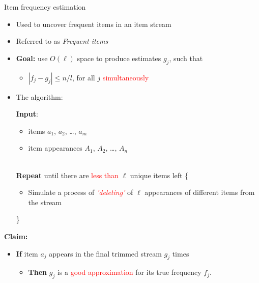\documentclass[first=dgreen,second=purple,logo=redque]{aaltoslides}
\begin{document}
\begin{frame}[allowframebreaks=1]{Item frequency estimation}
\begin{itemize}
    \item Used to uncover \textcolor{dgreen}{frequent} items in an item stream 
	\item Referred to as \textcolor{dgreen}{\textit{Frequent-items}}
	\item \textbf{Goal:} use $O(\ell)$ space to produce estimates $g_{j}$, such
	that
	\begin{itemize}\item{$|f_{j} - g_{j} | \leq n/l$}, for all $j$
	\textcolor{red}{simultaneously}\end{itemize}

\item The algorithm:
  \begin{algorithmic}
    \State \textbf{Input}:\begin{itemize}\item \textcolor{dgreen}{items} $a_{1}$, $a_{2}$, \ldots,
    $a_{m}$
    \item \textcolor{dgreen}{item appearances} $A_{1}$, $A_{2}$, \ldots,
    $A_{n}$\end{itemize}
    \\\State \textbf{Repeat} until there are \textcolor{red}{less than}
    $\ell$ \textcolor{dgreen}{unique} items left \{
     \begin{itemize}\item Simulate a process of
     \textcolor{red}{\textit{'deleting'}} of $\ell$ appearances of
     \textcolor{dgreen}{different} items from the stream\end{itemize}
    \State \}
  \end{algorithmic}
\end{itemize}


\framebreak

\textbf{Claim:}

\begin{itemize}
\item \textbf{If} item $a_{j}$ appears in the \textcolor{dgreen}{final} trimmed
stream $g_{j}$ times
\begin{itemize}
  \item \textbf{Then} $g_{j}$ is a \textcolor{red}{good approximation} for its
  true frequency $f_{j}$.%
\end{itemize}         
\end{itemize}


\end{frame}
\end{document}
